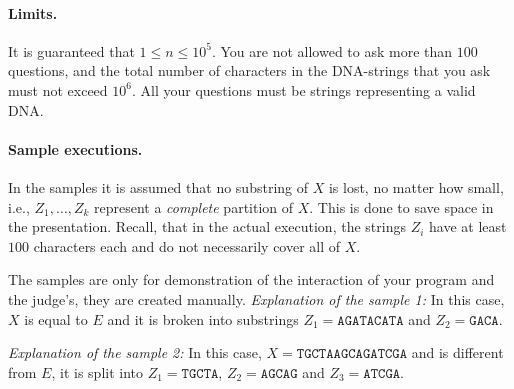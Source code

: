 \paragraph{Limits.}
It is guaranteed that $1 \leq n \leq 10^5$.
You are not allowed to ask more than $100$ questions, and the total number of characters in the DNA-strings that you ask must not exceed $10^6$.
All your questions must be strings representing a valid DNA.

\paragraph{Sample executions.}
In the samples it is assumed that no substring of $X$ is lost, no matter how small, i.e., $Z_1, \dots, Z_k$ represent a \emph{complete} partition of $X$.
This is done to save space in the presentation.
Recall, that in the actual execution, the strings $Z_i$ have at least $100$ characters each and do not necessarily cover all of $X$.

The samples are only for demonstration of the interaction of your program and the judge's, they are created manually.
{
\renewcommand{\sampleinputname}{Laboratory's feedback}
\renewcommand{\sampleoutputname}{Your questions}
}
\emph{Explanation of the sample 1:}
In this case, $X$ is equal to $E$ and it is broken into substrings $Z_1 = \texttt{AGATACATA}$ and $Z_2 = \texttt{GACA}$.

{
\renewcommand{\sampleinputname}{Laboratory's feedback}
\renewcommand{\sampleoutputname}{Your questions}
}
\emph{Explanation of the sample 2:}
In this case, $X = \texttt{TGCTAAGCAGATCGA}$ and is different from $E$, it is split into $Z_1 = \texttt{TGCTA}$, $Z_2 = \texttt{AGCAG}$ and $Z_3 = \texttt{ATCGA}$.